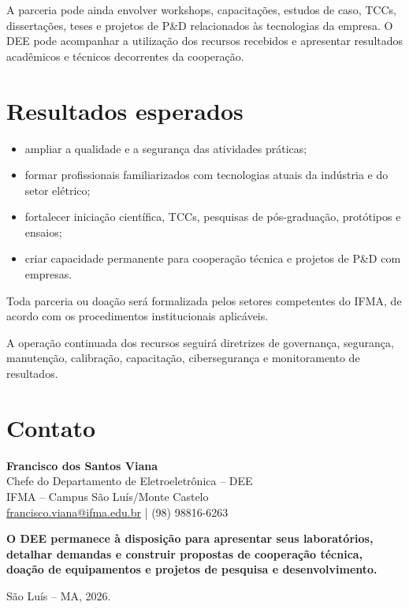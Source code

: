 \documentclass[12pt,a4paper]{article}
\begin{document}
A parceria pode ainda envolver workshops, capacitações, estudos de caso, TCCs, dissertações, teses e projetos de P\&D relacionados às tecnologias da empresa. O DEE pode acompanhar a utilização dos recursos recebidos e apresentar resultados acadêmicos e técnicos decorrentes da cooperação.

\clearpage
\section{Resultados esperados}\label{sec:resultados}
\begin{itemize}[leftmargin=*,itemsep=1.2mm]
\item ampliar a qualidade e a segurança das atividades práticas;
\item formar profissionais familiarizados com tecnologias atuais da indústria e do setor elétrico;
\item fortalecer iniciação científica, TCCs, pesquisas de pós-graduação, protótipos e ensaios;
\item criar capacidade permanente para cooperação técnica e projetos de P\&D com empresas.
\end{itemize}

Toda parceria ou doação será formalizada pelos setores competentes do IFMA, de acordo com os procedimentos institucionais aplicáveis.

A operação continuada dos recursos seguirá diretrizes de governança, segurança, manutenção, calibração, capacitação, cibersegurança e monitoramento de resultados.

\section{Contato}\label{sec:contato}
\begin{tcolorbox}[
  colback=azulpetroleo!5,
  colframe=azulpetroleo!35,
  boxrule=0.6pt,
  arc=1.6mm,
  left=4mm,right=4mm,top=3mm,bottom=3mm
]
\textbf{Francisco dos Santos Viana}\\
Chefe do Departamento de Eletroeletrônica -- DEE\\
IFMA -- Campus São Luís/Monte Castelo\\
\href{mailto:francisco.viana@ifma.edu.br}{francisco.viana@ifma.edu.br} \quad | \quad (98) 98816-6263

\vspace{1.5mm}
\textbf{O DEE permanece à disposição para apresentar seus laboratórios, detalhar demandas e construir propostas de cooperação técnica, doação de equipamentos e projetos de pesquisa e desenvolvimento.}
\end{tcolorbox}

\vfill
\begin{center}
São Luís -- MA, 2026.
\end{center}
\end{document}
